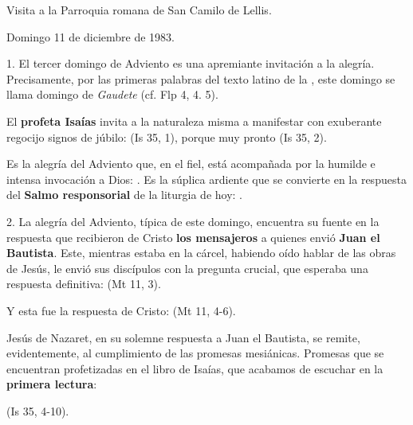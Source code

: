 Visita a la Parroquia romana de San Camilo de Lellis.

Domingo 11 de diciembre de 1983.

1. El tercer domingo de Adviento es una apremiante invitación a la alegría. Precisamente, por las primeras palabras del texto latino de la , este domingo se llama domingo de \emph{Gaudete} (cf. Flp 4, 4. 5).

El \textbf{profeta Isaías} invita a la naturaleza misma a manifestar con exuberante regocijo signos de júbilo:  (Is 35, 1), porque muy pronto  (Is 35, 2).

Es la alegría del Adviento que, en el fiel, está acompañada por la humilde e intensa invocación a Dios: . Es la súplica ardiente que se convierte en la respuesta del \textbf{Salmo responsorial} de la liturgia de hoy: .

2. La alegría del Adviento, típica de este domingo, encuentra su fuente en la respuesta que recibieron de Cristo \textbf{los mensajeros} a quienes envió \textbf{Juan el Bautista}. Este, mientras estaba en la cárcel, habiendo oído hablar de las obras de Jesús, le envió sus discípulos con la pregunta crucial, que esperaba una respuesta definitiva:  (Mt 11, 3).

Y esta fue la respuesta de Cristo:  (Mt 11, 4-6).

Jesús de Nazaret, en su solemne respuesta a Juan el Bautista, se remite, evidentemente, al cumplimiento de las promesas mesiánicas. Promesas que se encuentran profetizadas en el libro de Isaías, que acabamos de escuchar en la \textbf{primera lectura}:

 (Is 35, 4-10).

